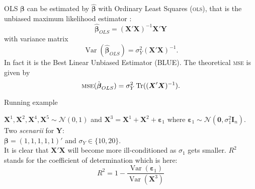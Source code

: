 \documentclass[11pt]{beamer}
\begin{document}
		\begin{frame}{OLS}
		$\boldsymbol{\beta}$ can be estimated by $\hat{\boldsymbol{\beta}}$ with Ordinary Least Squares (\textsc{ols}), that is the unbiased maximum likelihood estimator \cite{saporta2006probabilites,dodge2004analyse}: %
	\begin{equation}
		\boldsymbol{\hat{\beta}}_{OLS}=\left(\boldsymbol{X}'\boldsymbol{X} \right) ^{-1}\boldsymbol{X}'\boldsymbol{Y}\label{betaOLS}
	\end{equation}
	with variance matrix
	\begin{equation}
		\operatorname{Var}(\hat{\boldsymbol{\beta}}_{OLS})=\sigma_Y^2\left(\boldsymbol{X}'\boldsymbol{X} \right) ^{-1}. \label{eq:varOLS}
	\end{equation}
	 In fact it is the Best Linear Unbiased Estimator (BLUE).
	 The theoretical \textsc{mse} is given by
	\begin{equation}
	\textsc{mse}(\hat{\boldsymbol{\beta}}_{OLS})= \sigma_Y^2 \operatorname{Tr}((\boldsymbol{X}'\boldsymbol{X})^{-1}). \nonumber 
	\end{equation}
		\end{frame}
		
\begin{frame}{Running example}

$\boldsymbol{X}^1,\boldsymbol{X}^2,\boldsymbol{X}^4,\boldsymbol{X}^5  \sim \mathcal{N}(0,1)$  and 
$\boldsymbol{X}^3=\boldsymbol{X}^1+\boldsymbol{X}^2+\boldsymbol{\varepsilon}_1$ where 
$\boldsymbol{\varepsilon}_1\sim{\mathcal{N}(\boldsymbol{0},\sigma_1^2\boldsymbol{I}_n)}$. \\
Two {\it scenarii} for $\boldsymbol{Y}$:\\
 $\boldsymbol{\beta}=(1,1,1,1,1)'$ and $\sigma_Y \in \{10,20\}$.
 \\
It is clear that $\boldsymbol{X}'\boldsymbol{X}$ will become more ill-conditioned as $\sigma_1$ gets smaller. $R^2$ stands for the coefficient of determination which is here:
	\begin{equation}\label{defR2}
	R^2=1-\frac{\operatorname{Var}(\boldsymbol{\varepsilon}_1)}{\operatorname{Var}(\boldsymbol{X}^3)}
	\end{equation}

\end{frame}	
	
\end{document}
